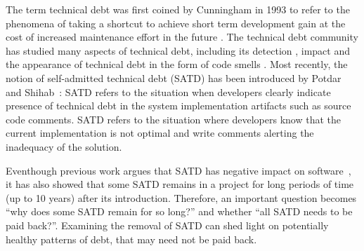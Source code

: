 
The term technical debt was first coined by Cunningham in 1993 to refer to the phenomena of taking a shortcut to achieve short term development gain at the cost of increased maintenance effort in the future \cite{Cunningham1992WPM}. The technical debt community has studied many aspects of technical debt, including its detection \cite{Zazworka2013EASE}, impact \cite{Zazworka2011MTD} and the appearance of technical debt in the form of code smells \cite{Fontana2012MTD}. 
Most recently, the notion of self-admitted technical debt (SATD) has been introduced by Potdar and Shihab~\cite{Potdar2014ICSME}: SATD refers to the situation when developers clearly indicate presence of
technical debt in the system implementation artifacts such as source code comments.
SATD refers to the situation where developers know that the current implementation is not optimal and write comments alerting the inadequacy of the solution. 




Eventhough previous work argues that SATD has negative impact on software~\cite{Wehaibi2016SANER,kameiusingTDA2016}, it has also showed that some SATD remains in a project for long periods of time (up to 10 years) after its introduction. Therefore, an important question becomes ``why does some SATD remain for so long?'' and whether ``all SATD needs to be paid back?''. Examining the removal of SATD can shed light on potentially healthy patterns of debt, that may need not be paid back.

